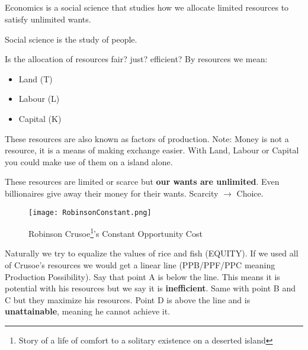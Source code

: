 
\subsection{}
\begin{definition}
    Economics is a social science that studies how we allocate limited resources
    to satisfy unlimited wants.
\end{definition}
\begin{definition}
    Social science is the study of people.
\end{definition}
Is the allocation of resources fair? just? efficient?
By resources we mean:
\begin{itemize}
    \item Land (T)
    \item Labour (L)
    \item Capital (K) 
\end{itemize}
These resources are also known as factors of production.
Note: Money is not a resource, it is a means of making exchange easier.
With Land, Labour or Capital you could make use of them on a island alone.

These resources are limited or scarce but \textbf{our wants are unlimited}. Even billionaires give away their money for their wants.
Scarcity $\rightarrow$ Choice.
\begin{figure}[h!]
    \begin{minipage}{\textwidth}
        \centering
        \texttt{[image: RobinsonConstant.png]}
        \caption[Constant Opportunity Cost]{Robinson Crusoe\footnote[1]{Story of a life of comfort to a solitary existence on a deserted island}'s Constant Opportunity Cost}
    \end{minipage}
\end{figure}
\begin{center}
\end{center}
Naturally we try to equalize the values of rice and fish (EQUITY).
If we used all of Crusoe's resources we would get a linear line (PPB/PPF/PPC meaning Production Possibility). Say that point A is below the line. This means it is potential with his resources but we say it is \textbf{inefficient}.
Same with point B and C but they maximize his resources. Point D is above the line and is \textbf{unattainable}, meaning he cannot achieve it.


